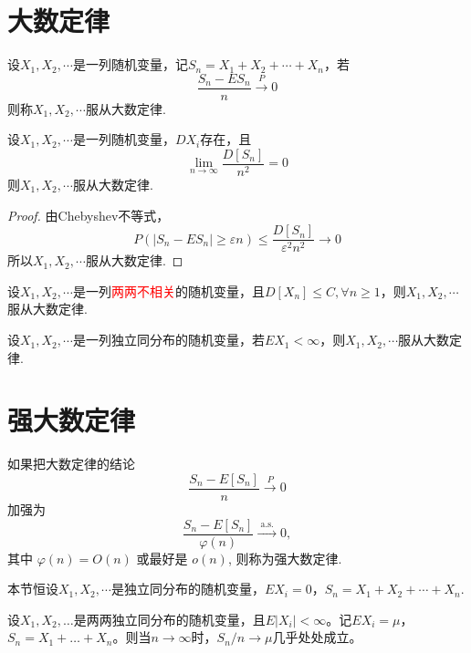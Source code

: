 \section{大数定律}

\begin{definition}[大数定律]
    设$X_1,X_2,\cdots$是一列随机变量，记$S_n=X_1+X_2+\cdots+X_n$，若
    \[
        \frac{S_n-ES_n}{n}\overset{P}{\to}0
    \]
    则称$X_1,X_2,\cdots$服从大数定律.
\end{definition}

\begin{theorem}[Markov大数定律]
    设$X_1,X_2,\cdots$是一列随机变量，$DX_i$存在，且
    \[
        \lim_{n\to\infty}\frac{D[S_n]}{n^2}=0
    \]
    则$X_1,X_2,\cdots$服从大数定律.
\end{theorem}
\begin{proof}
    由Chebyshev不等式，
    \[
        P(|S_n-ES_n|\ge \varepsilon n)\le \frac{D[S_n]}{\varepsilon^2 n^2}\to 0
    \]
    所以$X_1,X_2,\cdots$服从大数定律.
\end{proof}
\begin{corollary}[Chebyshev大数定律]
    设$X_1,X_2,\cdots$是一列\textcolor{red}{两两不相关}的随机变量，且$D[X_n]\le C,\forall n\ge 1$，则$X_1,X_2,\cdots$服从大数定律.
\end{corollary}

\begin{theorem}[Khinchin大数定律]
    设$X_1,X_2,\cdots$是一列独立同分布的随机变量，若$EX_1<\infty$，则$X_1,X_2,\cdots$服从大数定律.
\end{theorem}

\section{强大数定律}

如果把大数定律的结论
$$
    \frac{S_n-E\left[S_n\right]}{n} \xrightarrow{P} 0
$$
加强为
$$
    \frac{S_n-E\left[S_n\right]}{\varphi(n)} \xrightarrow{\text { a.s. }} 0,
$$
其中 $\varphi(n)=O(n)$ 或最好是 $o(n)$, 则称为强大数定律.
\begin{note}
    本节恒设$X_1,X_2,\cdots$是独立同分布的随机变量，$EX_i=0$，$S_n=X_1+X_2+\cdots+X_n$.
\end{note}
\begin{theorem}[强大数定律]
    设$X_1, X_2, \ldots$是两两独立同分布的随机变量，且$E\left|X_i\right|<\infty$。记$E X_i=\mu$，$S_n=X_1+\ldots+X_n$。则当$n \rightarrow \infty$时，$S_n / n \rightarrow \mu$几乎处处成立。
\end{theorem}




